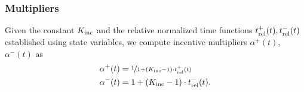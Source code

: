 \documentclass[9pt,oneside]{amsart}
\begin{document}
\begin{multicols}{2}
\subsubsection{Multipliers}
Given the constant $K_\textnormal{inc}$  %
and the relative normalized time functions $t^+_\textnormal{rel}(t), t^-_\textnormal{rel}(t)$ established using state variables, we compute incentive multipliers $\alpha^+(t)$, $\alpha^-(t)$ as
\begin{align}
\alpha^+(t) &= \nicefrac{1}{1 + (K_\textnormal{inc} - 1)\cdot t_\textnormal{rel}^+(t)}\\
\alpha^-(t) &= 1 + (K_\textnormal{inc} - 1)\cdot t_\textnormal{rel}^-(t). 
\end{align}

\end{multicols}
\end{document}

